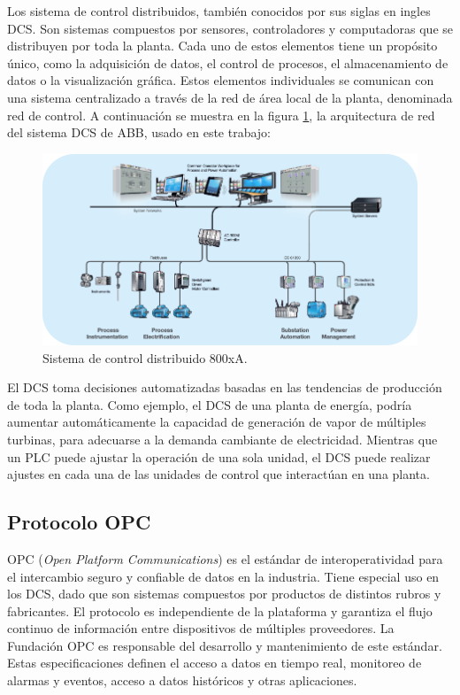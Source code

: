 Los sistema de control distribuidos, también conocidos por sus siglas en ingles DCS. Son sistemas compuestos por sensores, controladores y computadoras que se distribuyen por toda la planta. Cada uno de estos elementos tiene un propósito único, como la adquisición de datos, el control de procesos, el almacenamiento de datos o la visualización gráfica. Estos elementos individuales se comunican con una sistema centralizado a través de la red de área local de la planta, denominada red de control. A continuación se muestra en la figura \ref{fig:800xA}, la arquitectura de red del sistema DCS de ABB, usado en este trabajo:

\begin{figure}[htpb]
	\centering
	\includegraphics[width=\textwidth]{./Figures/800xA.png}
	\caption{Sistema de control distribuido 800xA\protect\footnotemark.}
	\label{fig:800xA}
\end{figure}


El DCS toma decisiones automatizadas basadas en las tendencias de producción de toda la planta. Como ejemplo, el DCS de una planta de energía, podría aumentar automáticamente la capacidad de generación de vapor de múltiples turbinas, para adecuarse a la demanda cambiante de electricidad. Mientras que un PLC puede ajustar la operación de una sola unidad, el DCS puede realizar ajustes en cada una de las unidades de control que interactúan en una planta.

\subsection{Protocolo OPC}

OPC (\textit{Open Platform Communications}) es el estándar de interoperatividad para el intercambio seguro y confiable de datos en la industria. Tiene especial uso en los DCS, dado que son sistemas compuestos por productos de distintos rubros y fabricantes. El protocolo es independiente de la plataforma y garantiza el flujo continuo de información entre dispositivos de múltiples proveedores. La Fundación OPC es responsable del desarrollo y mantenimiento de este estándar. Estas especificaciones definen el acceso a datos en tiempo real, monitoreo de alarmas y eventos, acceso a datos históricos y otras aplicaciones. 

